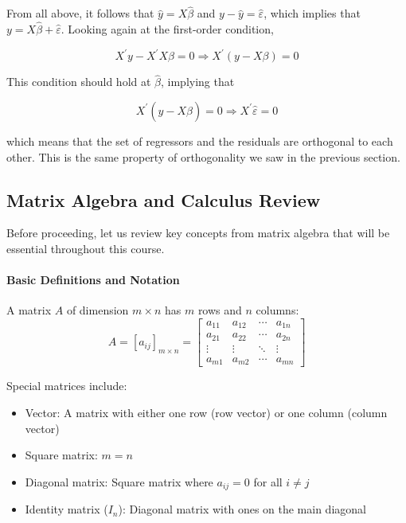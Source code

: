 From all above, it follows that $\widehat{y}=X \widehat{\beta}$ and $y-\widehat{y}=\widehat{\varepsilon}$, which implies that $y=X \widehat{\beta}+\widehat{\varepsilon}$. Looking again at the first-order condition,

$$
X^{\prime} y-X^{\prime} X \beta=0 \Longrightarrow X^{\prime}(y-X \beta)=0
$$

This condition should hold at $\widehat{\beta}$, implying that

$$
X^{\prime}(y-X \widehat{\beta})=0 \Longrightarrow X^{\prime} \widehat{\varepsilon}=0
$$

which means that the set of regressors and the residuals are orthogonal to each other. This is the same property of orthogonality we saw in the previous section.

\subsection{Matrix Algebra and Calculus Review}

Before proceeding, let us review key concepts from matrix algebra that will be essential throughout this course.

\paragraph{Basic Definitions and Notation}
A matrix \(A\) of dimension \(m \times n\) has \(m\) rows and \(n\) columns:
\[ A = [a_{ij}]_{m \times n} = \begin{bmatrix} 
a_{11} & a_{12} & \cdots & a_{1n} \\
a_{21} & a_{22} & \cdots & a_{2n} \\
\vdots & \vdots & \ddots & \vdots \\
a_{m1} & a_{m2} & \cdots & a_{mn}
\end{bmatrix} \]

Special matrices include:
\begin{itemize}
    \item Vector: A matrix with either one row (row vector) or one column (column vector)
    \item Square matrix: \(m = n\)
    \item Diagonal matrix: Square matrix where \(a_{ij} = 0\) for all \(i \neq j\)
    \item Identity matrix (\(I_n\)): Diagonal matrix with ones on the main diagonal
\end{itemize}

